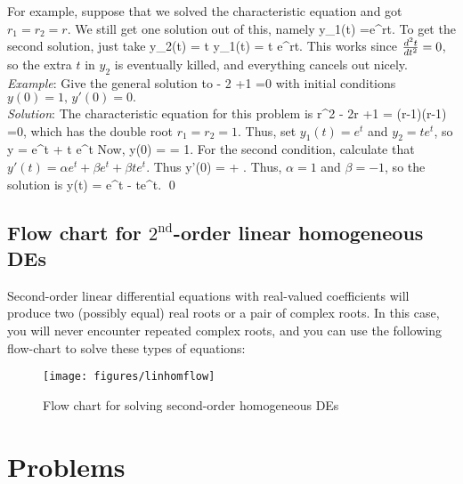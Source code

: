 \documentclass[12pt]{book}
\begin{document}
For example, suppose that we solved the characteristic equation and got
$r_1=r_2=r$. We still get one solution out of this, namely
\bee
y_1(t) =e^{rt}.
\eee
To get the second solution, just take
\bee
y_2(t) = t y_1(t) = t e^{rt}.
\eee
This works since $\frac{d^2 t}{d t^2}=0$, so the extra $t$ in $y_2$ is eventually
killed, and everything cancels out nicely.
\\

\noindent\emph{Example}: Give the general solution to
\bee
{} - 2 +1 =0
\eee
with initial conditions $y(0) =1, \, y'(0) =0.$\\
\noindent\emph{Solution}:
The characteristic equation for this problem is
\bee
r^2 - 2r +1 = (r-1)(r-1) =0,
\eee
which has the double root $r_1=r_2=1$. Thus, set
$y_1(t) = e^t$ and $y_2=t e^t$, so
\bee
y = \alpha e^t + \beta t e^t
\eee
Now,
\bee
y(0) = \alpha = 1.
\eee
For the second condition, calculate that
$y'(t) = \alpha e^t + \beta e^t + \beta te^t$. Thus
\bee
y'(0) = \alpha + .
\eee
Thus, $\alpha=1$ and $\beta =-1$, so the solution is
\bee
y(t) = e^t - te^t. \qed
\eee

\newpage
\subsection{Flow chart for $2^{\text{nd}}$-order linear homogeneous DEs}

Second-order linear differential equations with real-valued
coefficients will produce two (possibly equal) real roots or a pair of
complex roots.  In this case, you will never encounter repeated
complex roots, and you can use the following flow-chart to solve these
types of equations:

\vspace{0.5in}
\begin{figure}[h]
  \centering
  \texttt{[image: figures/linhomflow]}
  \caption{Flow chart for solving second-order homogeneous DEs}
  \label{fig:linhomflow}
\end{figure}



\section{Problems}
\end{document}
